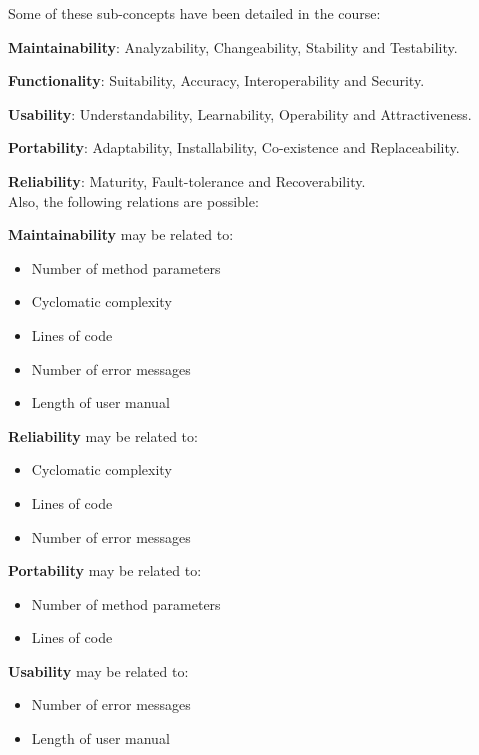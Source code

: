 \documentclass[a4paper,11pt]{report}
\begin{document}
Some of these sub-concepts have been detailed in the course:

\noindent
\textbf{Maintainability}: Analyzability, Changeability, Stability and
Testability.

\noindent
\textbf{Functionality}: Suitability, Accuracy, Interoperability and Security.

\noindent
\textbf{Usability}: Understandability, Learnability, Operability and
Attractiveness.

\noindent
\textbf{Portability}: Adaptability, Installability, Co-existence and
Replaceability.

\noindent
\textbf{Reliability}: Maturity, Fault-tolerance and Recoverability.\\

Also, the following relations are possible:

\noindent
\textbf{Maintainability} may be related to:
\begin{itemize}
\item Number of method parameters
\item Cyclomatic complexity
\item Lines of code
\item Number of error messages
\item Length of user manual
\end{itemize}

\noindent
\textbf{Reliability} may be related to:
\begin{itemize}
\item Cyclomatic complexity
\item Lines of code
\item Number of error messages
\end{itemize}

\noindent
\textbf{Portability} may be related to:
\begin{itemize}
\item Number of method parameters
\item Lines of code
\end{itemize}

\noindent
\textbf{Usability} may be related to:
\begin{itemize}
\item Number of error messages
\item Length of user manual
\end{itemize}

\clearpage
\end{document}
